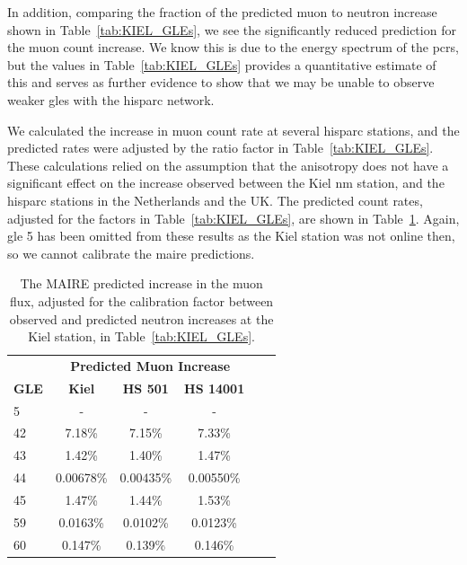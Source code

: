 In addition, comparing the fraction of the predicted muon to neutron increase shown in Table~\ref{tab:KIEL_GLEs}, we see the significantly reduced prediction for the muon count increase. We know this is due to the energy spectrum of the \glspl{pcr}, but the values in Table~\ref{tab:KIEL_GLEs} provides a quantitative estimate of this and serves as further evidence to show that we may be unable to observe weaker \glspl{gle} with the \gls{hisparc} network.

We calculated the increase in muon count rate at several \gls{hisparc} stations, and the predicted rates were adjusted by the ratio factor in Table~\ref{tab:KIEL_GLEs}. These calculations relied on the assumption that the anisotropy does not have a significant effect on the increase observed between the Kiel \gls{nm} station, and the \gls{hisparc} stations in the Netherlands and the UK. The predicted count rates, adjusted for the factors in Table~\ref{tab:KIEL_GLEs}, are shown in Table~\ref{tab:MAIRE_muons}. Again, \gls{gle} 5 has been omitted from these results as the Kiel station was not online then, so we cannot calibrate the \gls{maire} predictions.


\begin{table}[ht!]
	\begin{center}
		\caption{The MAIRE predicted increase in the muon flux, adjusted for the calibration factor between observed and predicted neutron increases at the Kiel station, in Table~\ref{tab:KIEL_GLEs}.}
		\label{tab:MAIRE_muons}
		\begin{tabular}{l c c c c c}
			\hline
			&  \multicolumn{3}{c}{\bf Predicted Muon Increase} \\
			{\bf GLE} & {\bf Kiel} & {\bf HS 501} & {\bf HS 14001} \\
			\hline
			5 & - & - & - \\
			42 & 7.18\%    & 7.15\%    & 7.33\%  \\
			43 & 1.42\%    & 1.40\%    & 1.47\%  \\
			44 & 0.00678\% & 0.00435\% & 0.00550\%  \\
			45 & 1.47\%    & 1.44\%    & 1.53\%  \\
			59 & 0.0163\%  & 0.0102\%  & 0.0123\%  \\
			60 & 0.147\%   & 0.139\%   & 0.146\%  \\
			\hline
		\end{tabular}
	\end{center}
\end{table}


